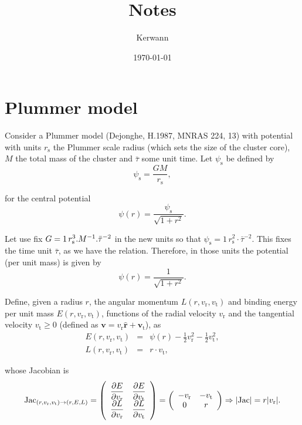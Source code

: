 \documentclass[11pt]{article}
\author{Kerwann}
\date{\today}
\title{Notes}
\newcommand{\rs}{\mathrm{s}}
\newcommand{\rt}{\mathrm{t}}
\newcommand{\rr}{\mathrm{r}}
\newcommand{\psis}{\psi_{\rs}}
\newcommand{\vr}{v_{\rr}}
\newcommand{\vt}{v_{\rt}}
\newcommand{\bv}{\boldsymbol{v}}
\newcommand{\bvt}{\boldsymbol{\vt}}
\newcommand{\br}{\boldsymbol{r}}
\newcommand{\hr}{\hat{\br}}
\begin{document}
\maketitle

\section{Plummer model}
\label{sec:Plummer}

  Consider a Plummer model (Dejonghe, H.1987, MNRAS 224, 13) with potential
with units $r_{\rs}$ the Plummer scale radius (which sets the size
of the cluster core), $M$ the total mass of the cluster and $\bar{\tau}$
some unit time. Let $\psis$ be defined by
\begin{equation}
\psis = \frac{G M}{r_{\rs}} ,
\label{eq:def_psi_s}
\end{equation}

for the central potential
\begin{equation}
\psi(r)=\frac{\psis}{\sqrt{1+r^{2}}} .
\label{eq:def_potential}
\end{equation}

Let use fix $G=1\,r_{\rs}^{3}.M^{-1}.{\rm \bar{\tau}^{-2}}$ in the
new units so that $\psis=1\,r_{\rs}^{2}\cdot\bar{\tau}^{-2}$. This
fixes the time unit $\bar{\tau}$, as we have the relation. Therefore, in
those units the potential (per unit mass) is given by
\begin{equation}
\psi(r)=\frac{1}{\sqrt{1+r^{2}}} .
\label{eq:def_potential_new_units}
\end{equation}

Define, given a radius $r$, the angular momentum $L(r,\vr,\vt)$
and binding energy per unit mass $E(r,\vr,\vt)$, functions of
the radial velocity $\vr$ and the tangential velocity $\vt\geq 0$
(defined as $\bv=\vr \hr + \bvt$),
as
\begin{equation}
\begin{array}{ccl}
E(r,\vr,\vt) & = & \psi(r)-\frac{1}{2} \vr^{2}-\frac{1}{2}\vt^{2} ,\\
L(r,\vr,\vt) & = & r \cdot \vt ,
\end{array}
\label{eq:v_to_E_L}
\end{equation}

whose Jacobian is
\begin{equation}
{\rm Jac}_{(r,\vr,\vt)\rightarrow(r,E,L)}=\left(\begin{array}{cc}
\displaystyle{\frac{\partial E}{\partial \vr}} & \displaystyle{\frac{\partial E}{\partial \vt}}\\
\displaystyle{\frac{\partial L}{\partial \vr}} & \displaystyle{\frac{\partial L}{\partial \vt}}
\end{array}\right)=\left(\begin{array}{cc}
-\vr & -\vt\\
0 & r
\end{array}\right)\Rightarrow|{\rm Jac}|=r|\vr| .
\label{eq:Jacobian}
  \end{equation}
\end{document}
